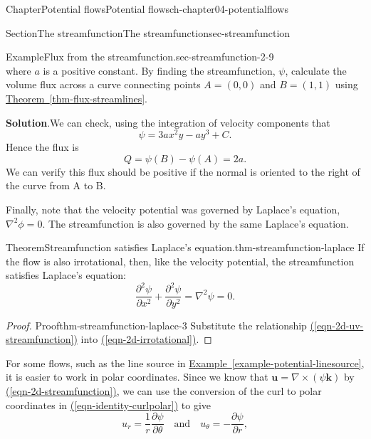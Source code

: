 \documentclass[oneside,10pt,]{book}
\newcommand{\blocktitlefont}{\relax}
\newcommand{\xreffont}{\relax}
\numberwithin{equation}{section}
\newcommand{\pd}[2]{\frac{\partial#1}{\partial#2}}
\newcommand{\bu}{\boldsymbol{u}}
\newcommand{\bk}{\boldsymbol{k}}
\begin{document}
\begin{chapterptx}{Chapter}{Potential flows}{}{Potential flows}{}{}{ch-chapter04-potentialflows}
\begin{sectionptx}{Section}{The streamfunction}{}{The streamfunction}{}{}{sec-streamfunction}
\begin{introduction}{}
\begin{example}{Example}{Flux from the streamfunction.}{sec-streamfunction-2-9}
\begin{equation*}
\end{equation*}
where \(a\) is a positive constant. By finding the streamfunction, \(\psi\), calculate the volume flux across a curve connecting points \(A = (0, 0)\) and \(B = (1, 1)\) using \hyperref[thm-flux-streamlines]{Theorem~{\xreffont\ref{thm-flux-streamlines}}}.%
\par\smallskip%
\noindent\textbf{\blocktitlefont Solution}.\hypertarget{sec-streamfunction-2-9-3}{}\quad{}We can check, using the integration of velocity components that%
\begin{equation*}
\psi = 3ax^2 y - a y^3 + C.
\end{equation*}
Hence the flux is%
\begin{equation*}
Q = \psi(B) - \psi(A) = 2a.
\end{equation*}
We can verify this flux should be positive if the normal is oriented to the right of the curve from A to B.%
\end{example}
Finally, note that the velocity potential was governed by Laplace's equation, \(\nabla^2 \phi = 0\). The streamfunction is also governed by the same Laplace's equation.%
\begin{theorem}{Theorem}{Streamfunction satisfies Laplace's equation.}{}{thm-streamfunction-laplace}%
If the flow is also irrotational, then, like the velocity potential, the streamfunction satisfies Laplace's equation:%
\begin{equation}
\pd{^2 \psi}{x^2} + \pd{^2 \psi}{y^2} = \nabla^2 \psi = 0.\label{eqn-2d-streamfunction-laplace}
\end{equation}
%
\end{theorem}
\begin{proof}{Proof}{}{thm-streamfunction-laplace-3}
Substitute the relationship \hyperref[eqn-2d-uv-streamfunction]{({\xreffont\ref{eqn-2d-uv-streamfunction}})} into \hyperref[eqn-2d-irrotational]{({\xreffont\ref{eqn-2d-irrotational}})}.%
\end{proof}
For some flows, such as the line source in \hyperref[example-potential-linesource]{Example~{\xreffont\ref{example-potential-linesource}}}, it is easier to work in polar coordinates. Since we know that \(\bu = \nabla \times (\psi \bk)\) by \hyperref[eqn-2d-streamfunction]{({\xreffont\ref{eqn-2d-streamfunction}})}, we can use the conversion of the curl to polar coordinates in \hyperref[eqn-identity-curlpolar]{({\xreffont\ref{eqn-identity-curlpolar}})} to give%
\begin{equation}
u_r = \frac{1}{r} \pd{\psi}{\theta} \quad \textrm{and} \quad u_{\theta} = -\pd{\psi}{r},\label{eqn-streamfunction-polar}

\end{equation}
\end{introduction}
\end{sectionptx}
\end{chapterptx}
\end{document}
